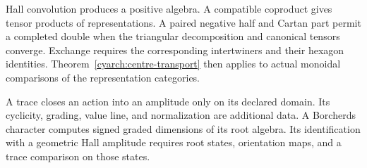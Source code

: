 Hall convolution produces a positive algebra.
A compatible coproduct gives tensor products of representations.
A paired negative half and Cartan part permit a completed double when
the triangular decomposition and canonical tensors converge.
Exchange requires the corresponding intertwiners and their hexagon
identities.
Theorem~\ref{cyarch:centre-transport} then applies to actual monoidal
comparisons of the representation categories.

A trace closes an action into an amplitude only on its declared domain.
Its cyclicity, grading, value line, and normalization are additional data.
A Borcherds character computes signed graded dimensions of its root
algebra.
Its identification with a geometric Hall amplitude requires root states,
orientation maps, and a trace comparison on those states.
